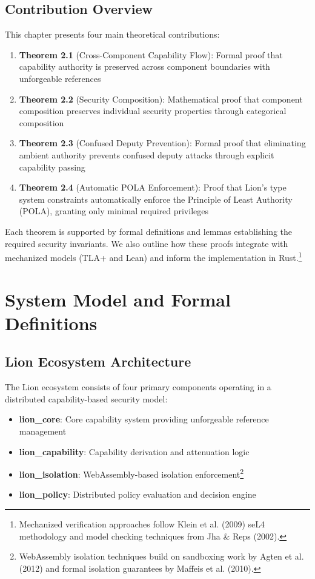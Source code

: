 \subsection{Contribution Overview}

This chapter presents four main theoretical contributions:

\begin{enumerate}
\item \textbf{Theorem 2.1} (Cross-Component Capability Flow): Formal proof that capability authority is preserved across component boundaries with unforgeable references
\item \textbf{Theorem 2.2} (Security Composition): Mathematical proof that component composition preserves individual security properties through categorical composition
\item \textbf{Theorem 2.3} (Confused Deputy Prevention): Formal proof that eliminating ambient authority prevents confused deputy attacks through explicit capability passing
\item \textbf{Theorem 2.4} (Automatic POLA Enforcement): Proof that Lion's type system constraints automatically enforce the Principle of Least Authority (POLA), granting only minimal required privileges
\end{enumerate}

Each theorem is supported by formal definitions and lemmas establishing the required security invariants. We also outline how these proofs integrate with mechanized models (TLA+ and Lean) and inform the implementation in Rust.\footnote{Mechanized verification approaches follow Klein et al. (2009) seL4 methodology and model checking techniques from Jha \& Reps (2002).}

\newpage

\section{System Model and Formal Definitions}

\subsection{Lion Ecosystem Architecture}

The Lion ecosystem consists of four primary components operating in a distributed capability-based security model:

\begin{itemize}
\item \textbf{lion\_core}: Core capability system providing unforgeable reference management
\item \textbf{lion\_capability}: Capability derivation and attenuation logic
\item \textbf{lion\_isolation}: WebAssembly-based isolation enforcement\footnote{WebAssembly isolation techniques build on sandboxing work by Agten et al. (2012) and formal isolation guarantees by Maffeis et al. (2010).}
\item \textbf{lion\_policy}: Distributed policy evaluation and decision engine
\end{itemize}

